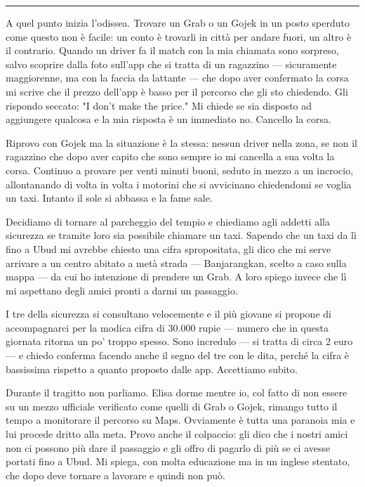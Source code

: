 \begin{center}
    \noindent\rule{0.6\textwidth}{0.4pt}
\end{center}

A quel punto inizia l'odissea. Trovare un Grab o un Gojek in un posto sperduto come questo non è facile: un conto è trovarli in città per andare fuori, un altro è il contrario. Quando un driver fa il match con la mia chiamata sono sorpreso, salvo scoprire dalla foto sull'app che si tratta di un ragazzino — sicuramente maggiorenne, ma con la faccia da lattante — che dopo aver confermato la corsa mi scrive che il prezzo dell'app è basso per il percorso che gli sto chiedendo. Gli rispondo seccato: "I don't make the price." Mi chiede se sia disposto ad aggiungere qualcosa e la mia risposta è un immediato no. Cancello la corsa.

Riprovo con Gojek ma la situazione è la stessa: nessun driver nella zona, se non il ragazzino che dopo aver capito che sono sempre io mi cancella a sua volta la corsa. Continuo a provare per venti minuti buoni, seduto in mezzo a un incrocio, allontanando di volta in volta i motorini che si avvicinano chiedendomi se voglia un taxi. Intanto il sole si abbassa e la fame sale.

Decidiamo di tornare al parcheggio del tempio e chiediamo agli addetti alla sicurezza se tramite loro sia possibile chiamare un taxi. Sapendo che un taxi da lì fino a Ubud mi avrebbe chiesto una cifra spropositata, gli dico che mi serve arrivare a un centro abitato a metà strada — Banjarangkan, scelto a caso sulla mappa — da cui ho intenzione di prendere un Grab. A loro spiego invece che lì mi aspettano degli amici pronti a darmi un passaggio.

I tre della sicurezza si consultano velocemente e il più giovane si propone di accompagnarci per la modica cifra di 30.000 rupie — numero che in questa giornata ritorna un po' troppo spesso. Sono incredulo — si tratta di circa 2 euro — e chiedo conferma facendo anche il segno del tre con le dita, perché la cifra è bassissima rispetto a quanto proposto dalle app. Accettiamo subito.

Durante il tragitto non parliamo. Elisa dorme mentre io, col fatto di non essere su un mezzo ufficiale verificato come quelli di Grab o Gojek, rimango tutto il tempo a monitorare il percorso su Maps. Ovviamente è tutta una paranoia mia e lui procede dritto alla meta. Provo anche il colpaccio: gli dico che i nostri amici non ci possono più dare il passaggio e gli offro di pagarlo di più se ci avesse portati fino a Ubud. Mi spiega, con molta educazione ma in un inglese stentato, che dopo deve tornare a lavorare e quindi non può.


